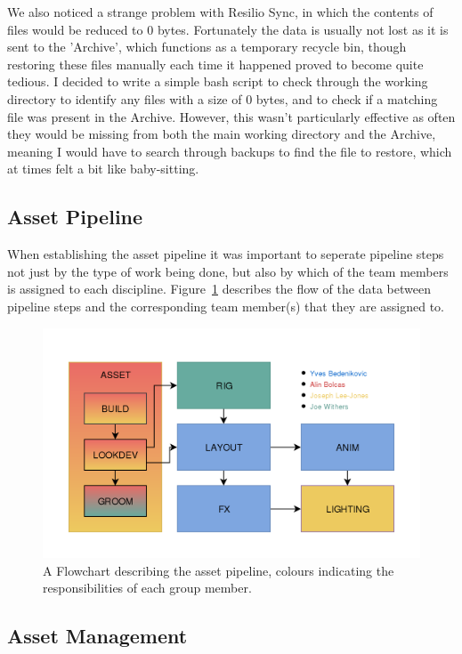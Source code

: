 \documentclass[11pt]{article}
\begin{document}
We also noticed a strange problem with Resilio Sync, in which the contents of files would be reduced to 0 bytes. Fortunately the data is usually not lost as it is sent to the 'Archive', which functions as a temporary recycle bin, though restoring these files manually each time it happened proved to become quite tedious. I decided to write a simple bash script to check through the working directory to identify any files with a size of 0 bytes, and to check if a matching file was present in the Archive. However, this wasn't particularly effective as often they would be missing from both the main working directory and the Archive, meaning I would have to search through backups to find the file to restore, which at times felt a bit like baby-sitting.

\subsection{Asset Pipeline}

When establishing the asset pipeline it was important to seperate pipeline steps not just by the type of work being done, but also by which of the team members is assigned to each discipline. Figure~\ref{figure:pipelineFlow} describes the flow of the data between pipeline steps and the corresponding team member(s) that they are assigned to.

\begin{figure}[htbp]\centering
	\includegraphics[width=1.0\linewidth]{images/pipeline.png}
	\caption{\label{figure:pipelineFlow} A Flowchart describing the asset pipeline, colours indicating the responsibilities of each group member.}
\end{figure}

\subsection{Asset Management}
\end{document}
